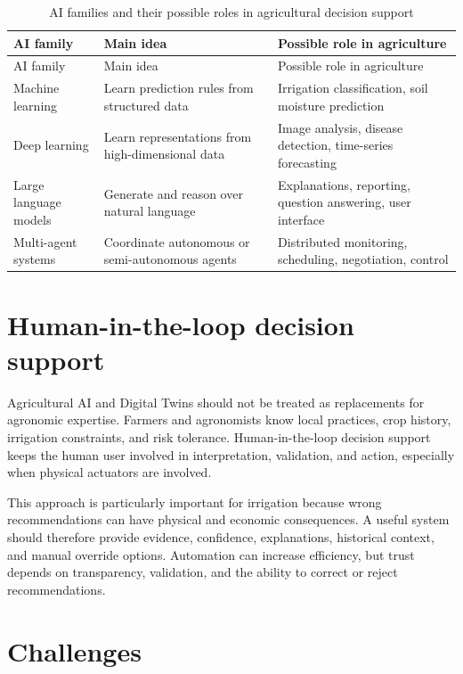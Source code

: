 \begin{footnotesize}
\setlength{\tabcolsep}{2pt}
\begin{longtable}{@{}>{\raggedright\arraybackslash}p{}>{\raggedright\arraybackslash}p{}>{\raggedright\arraybackslash}p{}@{}}
\caption{AI families and their possible roles in agricultural decision support}\\
\toprule
AI family & Main idea & Possible role in agriculture \\
\midrule
\endfirsthead
\toprule
AI family & Main idea & Possible role in agriculture \\
\midrule
\endhead
Machine learning & Learn prediction rules from structured data & Irrigation classification, soil moisture prediction \\
Deep learning & Learn representations from high-dimensional data & Image analysis, disease detection, time-series forecasting \\
Large language models & Generate and reason over natural language & Explanations, reporting, question answering, user interface \\
Multi-agent systems & Coordinate autonomous or semi-autonomous agents & Distributed monitoring, scheduling, negotiation, control \\
\bottomrule
\end{longtable}
\end{footnotesize}

\section{Human-in-the-loop decision support}

Agricultural AI and Digital Twins should not be treated as replacements for agronomic expertise. Farmers and agronomists know local practices, crop history, irrigation constraints, and risk tolerance. Human-in-the-loop decision support keeps the human user involved in interpretation, validation, and action, especially when physical actuators are involved.

This approach is particularly important for irrigation because wrong recommendations can have physical and economic consequences. A useful system should therefore provide evidence, confidence, explanations, historical context, and manual override options. Automation can increase efficiency, but trust depends on transparency, validation, and the ability to correct or reject recommendations.

\section{Challenges}

